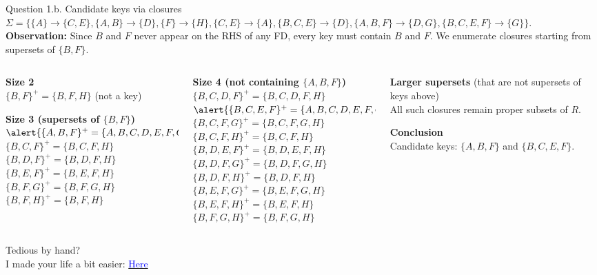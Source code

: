 \documentclass{beamer}
\begin{document}
\begin{frame}{Question 1.b. \; Candidate keys via closures}
\scriptsize
$\Sigma=\{\{A\} \to \{C,E\},\{A,B\} \to \{D\},\{F\} \to \{H\},\{C,E\} \to \{A\},\{B,C,E\} \to \{D\},\{A,B,F\} \to \{D,G\},\{B,C,E,F\} \to \{G\}\}$.\\
\textbf{Observation:} Since \alert{$B$} and \alert{$F$} never appear on the RHS of any FD, \alert{every key must contain $B$ and $F$}. We enumerate closures starting from supersets of $\{B,F\}$.

\pause
\tiny
\vspace{0.3cm}
\begin{columns}
\begin{column}{0.32\textwidth}
\textbf{Size 2}\\
$\{B,F\}^+ = \{B,F,H\}$ \; (not a key)

\medskip
\textbf{Size 3 (supersets of $\{B,F\}$)}\\
$\alert{\{A,B,F\}^+ = \{A,B,C,D,E,F,G,H\}}$ \\
$\{B,C,F\}^+ = \{B,C,F,H\}$ \\
$\{B,D,F\}^+ = \{B,D,F,H\}$ \\
$\{B,E,F\}^+ = \{B,E,F,H\}$ \\
$\{B,F,G\}^+ = \{B,F,G,H\}$ \\
$\{B,F,H\}^+ = \{B,F,H\}$
\end{column}
\pause
\begin{column}{0.34\textwidth}
\textbf{Size 4 (not containing $\{A,B,F\}$)}\\
$\{B,C,D,F\}^+ = \{B,C,D,F,H\}$ \\
$\alert{\{B,C,E,F\}^+ = \{A,B,C,D,E,F,G,H\}}$ \\
$\{B,C,F,G\}^+ = \{B,C,F,G,H\}$ \\
$\{B,C,F,H\}^+ = \{B,C,F,H\}$ \\
$\{B,D,E,F\}^+ = \{B,D,E,F,H\}$ \\
$\{B,D,F,G\}^+ = \{B,D,F,G,H\}$ \\
$\{B,D,F,H\}^+ = \{B,D,F,H\}$ \\
$\{B,E,F,G\}^+ = \{B,E,F,G,H\}$ \\
$\{B,E,F,H\}^+ = \{B,E,F,H\}$ \\
$\{B,F,G,H\}^+ = \{B,F,G,H\}$
\end{column}
\pause
\begin{column}{0.34\textwidth}
\textbf{Larger supersets} (that are not supersets of keys above)\\
All such closures remain proper subsets of $R$.

\medskip
\textbf{Conclusion}\\
\alert{Candidate keys: $\{A,B,F\}$ and $\{B,C,E,F\}$.}
\end{column}
\end{columns}

\medskip
\scriptsize
\begin{center}
    Tedious by hand?\\
I made your life a bit easier: \href{https://github.com/pratik2358/fucntional_dep}{\textcolor{blue}{Here}}
\end{center}
\end{frame}
\end{document}
